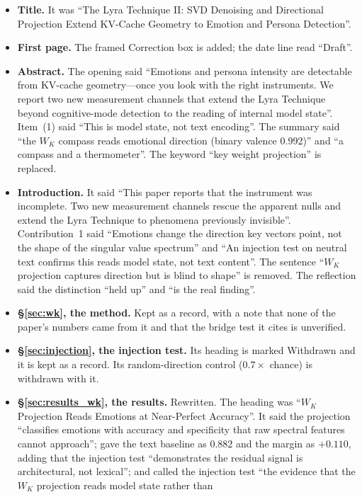 \documentclass[11pt,a4paper]{article}
\begin{document}
\begin{itemize}[nosep]
\item \textbf{Title.} It was ``The Lyra Technique II: SVD
  Denoising and Directional Projection Extend KV-Cache Geometry to Emotion
  and Persona Detection''.
\item \textbf{First page.} The framed Correction box is added; the date line
  read ``Draft''.
\item \textbf{Abstract.} The opening said ``Emotions and persona intensity
  are detectable from KV-cache geometry---once you look with the right
  instruments. We report two new measurement channels that extend the Lyra
  Technique beyond cognitive-mode detection to the reading of internal model
  state''. Item~(1) said ``This is model state, not text encoding''. The
  summary said ``the $W_K$ compass reads emotional direction (binary valence
  0.992)'' and ``a compass and a thermometer''. The keyword ``key weight
  projection'' is replaced.
\item \textbf{Introduction.} It said ``This paper reports that the
  instrument was incomplete. Two new measurement channels rescue the
  apparent nulls and extend the Lyra Technique to phenomena previously
  invisible''. Contribution~1 said ``Emotions change the direction key
  vectors point, not the shape of the singular value spectrum'' and ``An
  injection test on neutral text confirms this reads model state, not text
  content''. The sentence ``$W_K$ projection captures direction but is blind
  to shape'' is removed. The reflection said the distinction ``held up'' and
  ``is the real finding''.
\item \textbf{\S\ref{sec:wk}, the method.} Kept as a record, with a note
  that none of the paper's numbers came from it and that the bridge test it
  cites is unverified.
\item \textbf{\S\ref{sec:injection}, the injection test.} Its heading is
  marked Withdrawn and it is kept as a record. Its random-direction control
  ($0.7\times$ chance) is withdrawn with it.
\item \textbf{\S\ref{sec:results_wk}, the results.} Rewritten. The heading
  was ``$W_K$ Projection Reads Emotions at Near-Perfect Accuracy''. It said
  the projection ``classifies emotions with accuracy and specificity that raw
  spectral features cannot approach''; gave the text baseline as $0.882$ and
  the margin as $+0.110$, adding that the injection test ``demonstrates the
  residual signal is architectural, not lexical''; and called the injection
  test ``the evidence that the $W_K$ projection reads model state rather than

\end{itemize}
\end{document}
